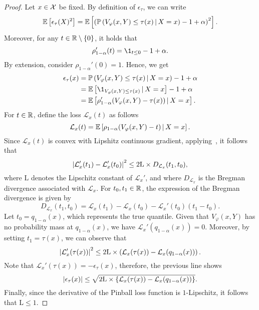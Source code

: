 \begin{proof}
  Let $x\in\mathcal{X}$ be fixed. By definition of $\epsilon_{\tau}$, we can write
  \begin{align*}
    \mathbb{E}\left[{\epsilon_\tau(X)^2}\right]
    = \mathbb{E}\left[{\left({\mathbb{P}\left({V_\varphi(x,Y)\le \tau(x) \,\vert\, X=x}\right) - 1  + \alpha}\right)^2}\right].
  \end{align*}
  Moreover, for any $t\in\mathbb{R}\setminus \{0\}$, it holds that
  \begin{equation*}
    \rho_{1-\alpha}'(t) = \1_{t\le 0} - 1 + \alpha.
  \end{equation*}
  By extension, consider $\rho_{1-\alpha}'(0)=1$. Hence, we get
  \begin{align*}
    \epsilon_\tau(x)
    &= \prob\pr{V_\varphi(x,Y)\le \tau(x) \,\vert\, X=x} - 1  + \alpha
    \\
    &= \E\br{\1_{V_\varphi(x,Y)\le \tau(x)} \,\vert\, X=x} - 1 + \alpha
    \\
    &= \E\br{\rho_{1-\alpha}'\prn{V_\varphi(x,Y) - \tau(x)} \,\vert\, X=x}.
  \end{align*}
  For $t\in\mathbb{R}$, define the loss $\mathcal{L}_{x}(t)$ as follows
  \begin{equation*}
    \mathcal{L}_{x}(t)
    = \mathbb{E}\left[{\rho_{1-\alpha}({V_\varphi(x,Y) - t}) \,\vert\, X=x}\right].
  \end{equation*}
  Since $\mathcal{L}_{x}(t)$ is convex with Lipshitz continuous gradient, applying~\cite[Theorem~2.1.5]{nesterov1998introductory}, it follows that
  \begin{equation*}
    \left\lvert{\mathcal{L}_{x}'(t_1) - \mathcal{L}_{x}'(t_0)}\right\rvert^2
    \le 2 \mathrm{L} \times D_{\mathcal{L}_{x}}(t_1, t_0),
  \end{equation*}
  where $\mathrm{L}$ denotes the Lipschitz constant of $\mathcal{L}_{x}'$, and where $D_{\mathcal{L}_{x}}$ is the Bregman divergence associated with $\mathcal{L}_{x}$.
  For $t_0,t_1\in\mathbb{R}$, the expression of the Bregman divergence is given by
  \begin{equation*}
    D_{\mathcal{L}_{x}}(t_1, t_0)
    = \mathcal{L}_{x}(t_1) - \mathcal{L}_{x}(t_0) - \mathcal{L}_{x}'(t_0) (t_1 - t_0).
  \end{equation*}
  Let $t_0 = q_{1-\alpha}(x)$, which represents the true quantile. Given that $V_\varphi(x,Y)$ has no probability mass at $q_{1-\alpha}(x)$, we have $\mathcal{L}_{x}'(q_{1-\alpha}(x))=0$. Moreover, by setting $t_1 = \tau(x)$, we can observe that
  \begin{equation*}
    \left\lvert{\mathcal{L}_{x}'(\tau(x))}\right\rvert^2
    \le 2 \mathrm{L} \times \left({ \mathcal{L}_{x}(\tau(x)) - \mathcal{L}_{x}(q_{1-\alpha}(x)) }\right).
  \end{equation*}
  Note that $\mathcal{L}_{x}'(\tau(x))=-\epsilon_{\tau}(x)$, therefore, the previous line shows
  \begin{equation*}
    \left\lvert{\epsilon_{\tau}(x)}\right\rvert
    \le \sqrt{ 2 \mathrm{L} \times \left\{{ \mathcal{L}_{x}(\tau(x)) - \mathcal{L}_{x}(q_{1-\alpha}(x)) }\right\} }.
  \end{equation*}
  Finally, since the derivative of the Pinball loss function is $1$-Lipschitz, it follows that $\mathrm{L}\le 1$.
\end{proof}

